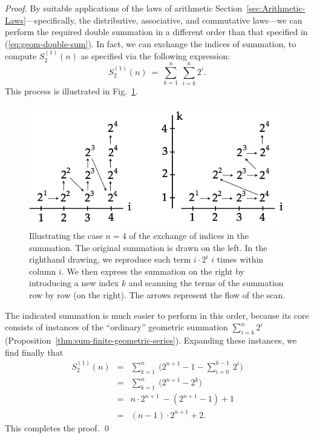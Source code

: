 \begin{proof}
By suitable applications of the laws of arithmetic
Section~\ref{sec:Arithmetic-Laws}---specifically, the distributive,
associative, and commutative laws---we can perform the required double
summation in a different order than that specified in
(\ref{eq:geom-double-sum}).  In fact, we can exchange the indices of
summation, to compute $S_2^{(1)}(n)$ as specified via the following expression:
\[
S_2^{(1)}(n) \ = \ \sum_{k=1}^{n} \ \sum_{i=k}^{n} 2^i.
\]
This process is illustrated in Fig.~\ref{fig:Sumi2i}.
\begin{figure}[htb]
\centerline{
\includegraphics[scale=0.4]{FiguresMaths/Sumi2i}
}
\caption{Illustrating the case $n=4$ of the exchange of indices in the
  summation.  The original summation is drawn on the left.  In the
  righthand drawing, we reproduce each term $i \cdot 2^i$ $i$ times
  within column $i$.  We then express the summation on the right by
  introducing a new index $k$ and scanning the terms of the summation
  row by row (on the right).  The arrows represent the flow of the
  scan.}
\label{fig:Sumi2i}
\end{figure}
The indicated summation is much easier to perform in this order,
because its core consists of instances of the ``ordinary'' geometric
summation $\sum_{i=k}^{n} 2^i$
(Proposition~\ref{thm:sum-finite-geometric-series}).  Expanding these
instances, we find finally that
\begin{eqnarray*}
S_2^{(1)}(n)
  & = &
\sum_{k=1}^{n} \ \big( 2^{n+1} -1 - \sum_{i=0}^{k-1} \ 2^i \big) \\
  & = &
\sum_{k=1}^{n} \ \big( 2^{n+1} - 2^k \big) \\
  & = &
n \cdot 2^{n+1}\ - ( 2^{n+1} -1) +1 \\
  & = &
(n-1) \cdot 2^{n+1} +2.
\end{eqnarray*}
This completes the proof.  \qed
\end{proof}


